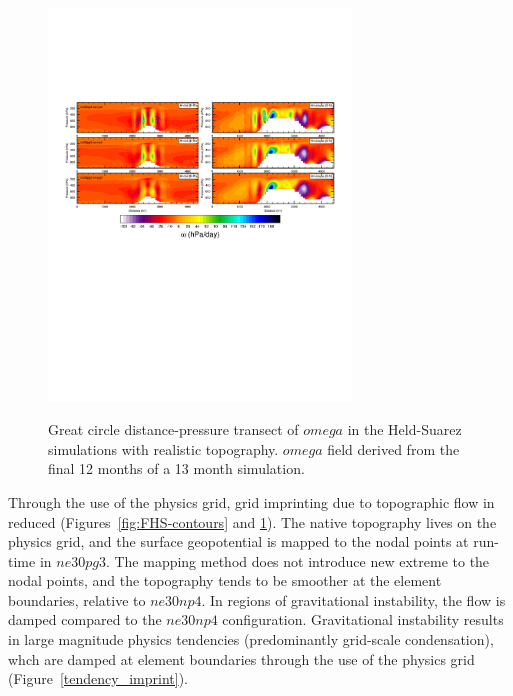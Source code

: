 \documentclass[twocol]{ametsoc}
\begin{document}
\begin{figure}[t]
\noindent\includegraphics[width=19pc,angle=0]{figs/FHS-transect-CROP.pdf}\\
\caption{Great circle distance-pressure transect of $omega$ in the Held-Suarez simulations with realistic topography. $omega$ field derived from the final 12 months of a 13 month simulation.}
\label{fig:FHS-transect}
\end{figure}

Through the use of the physics grid, grid imprinting due to topographic flow in reduced (Figures~\ref{fig:FHS-contours} and \ref{fig:FHS-transect}). The native topography lives on the physics grid, and the surface geopotential is mapped to the nodal points at run-time in $ne30pg3$. The mapping method does not introduce new extreme to the nodal points, and the topography tends to be smoother at the element boundaries, relative to $ne30np4$. In regions of gravitational instability, the flow is damped compared to the $ne30np4$ configuration. Gravitational instability results in large magnitude physics tendencies (predominantly grid-scale condensation), whch are damped at element boundaries through the use of the physics grid (Figure~\ref{tendency_imprint}). 
\end{document}
